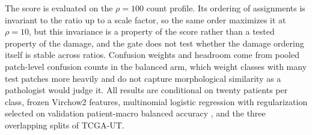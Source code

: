 The score is evaluated on the $\rho=100$ count profile. Its ordering of assignments is invariant to the ratio up to a scale factor, so the same order maximizes it at $\rho=10$, but this invariance is a property of the score rather than a tested property of the damage, and the gate does not test whether the damage ordering itself is stable across ratios. Confusion weights and headroom come from pooled patch-level confusion counts in the balanced arm, which weight classes with many test patches more heavily and do not capture morphological similarity as a pathologist would judge it. All results are conditional on twenty patients per class, frozen Virchow2 features, multinomial logistic regression with regularization selected on validation patient-macro balanced accuracy \citep{queisler2026patientShortage}, and the three overlapping splits of TCGA-UT.
